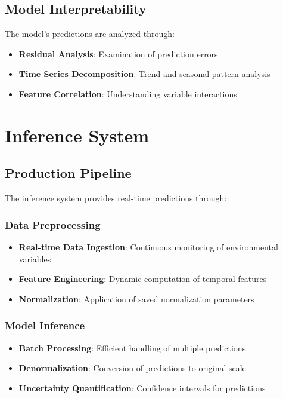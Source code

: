 \documentclass[12pt,a4paper]{article}
\begin{document}
\subsection{Model Interpretability}
The model's predictions are analyzed through:
\begin{itemize}
    \item \textbf{Residual Analysis}: Examination of prediction errors
    \item \textbf{Time Series Decomposition}: Trend and seasonal pattern analysis
    \item \textbf{Feature Correlation}: Understanding variable interactions
\end{itemize}

\section{Inference System}

\subsection{Production Pipeline}
The inference system provides real-time predictions through:

\subsubsection{Data Preprocessing}
\begin{itemize}
    \item \textbf{Real-time Data Ingestion}: Continuous monitoring of environmental variables
    \item \textbf{Feature Engineering}: Dynamic computation of temporal features
    \item \textbf{Normalization}: Application of saved normalization parameters
\end{itemize}

\subsubsection{Model Inference}
\begin{itemize}
    \item \textbf{Batch Processing}: Efficient handling of multiple predictions
    \item \textbf{Denormalization}: Conversion of predictions to original scale
    \item \textbf{Uncertainty Quantification}: Confidence intervals for predictions
\end{itemize}
\end{document}
